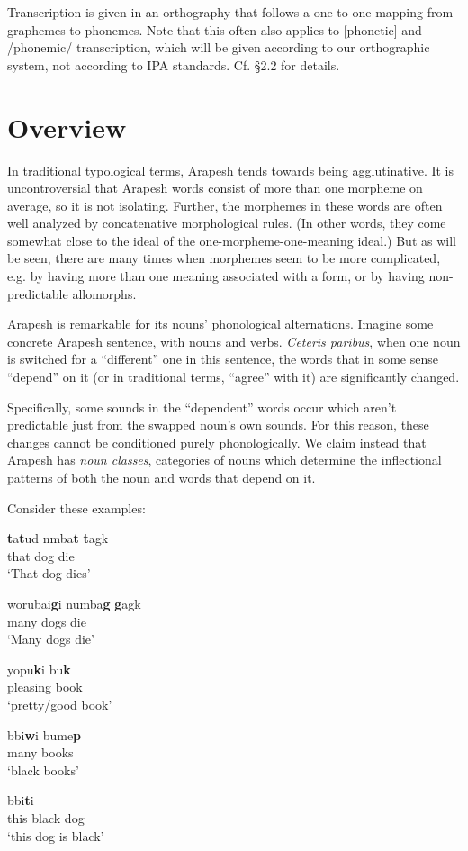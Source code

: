 \documentclass[pdftex,12pt,letterpaper]{article}
\let\ipa\textipa
\def\sw{\ipa{\super w}}
\begin{document}
Transcription is given in an orthography that follows a one-to-one mapping from graphemes to phonemes. Note that this often also applies to [phonetic] and /phonemic/ transcription, which will be given according to our orthographic system, not according to IPA standards. Cf. \S 2.2 for details.

\section{Overview}

In traditional typological terms, Arapesh tends towards being agglutinative. It is uncontroversial that Arapesh words consist of more than one morpheme on average, so it is not isolating. Further, the morphemes in these words are often well analyzed by concatenative morphological rules. (In other words, they come somewhat close to the ideal of the one-morpheme-one-meaning ideal.) But as will be seen, there are many times when morphemes seem to be more complicated, e.g. by having more than one meaning associated with a form, or by having non-predictable allomorphs.

Arapesh is remarkable for its nouns' phonological alternations. Imagine some concrete Arapesh sentence, with nouns and verbs. \emph{Ceteris paribus}, when one noun is switched for a ``different'' one in this sentence, the words that in some sense ``depend'' on it (or in traditional terms, ``agree'' with it) are significantly changed. 

Specifically, some sounds in the ``dependent'' words occur which aren't predictable just from the swapped noun's own sounds. For this reason, these changes cannot be conditioned purely phonologically. We claim instead that Arapesh has \emph{noun classes}, categories of nouns which determine the inflectional patterns of both the noun and words that depend on it.

Consider these examples:

\begin{exe}

\ex
\gll \textbf{t}a\textbf{t}ud n\ipa{1}mba\textbf{t} \textbf{t}agk \\
that dog die \\
\trans `That dog dies'

\ex
\gll worubai\textbf{g\sw}i numba\textbf{g\sw} \textbf{g\sw}agk \\
many dogs die \\
\trans `Many dogs die'

\ex
\gll yopu\textbf{k\sw}i bu\textbf{k\sw} \\
pleasing book\\
\trans `pretty/good book'

\ex
\gll b\ipa{@r@h@}bi\textbf{w}i bume\textbf{p} \\
many books\\
\trans `black books'

\ex
\gll \ipa{@\textbf{t}ind@} b\ipa{@r@h@}bi\textbf{t}i \ipa{n1mba\textbf{t}} \\
this black dog\\
\trans `this dog is black'

\end{exe}
\end{document}
